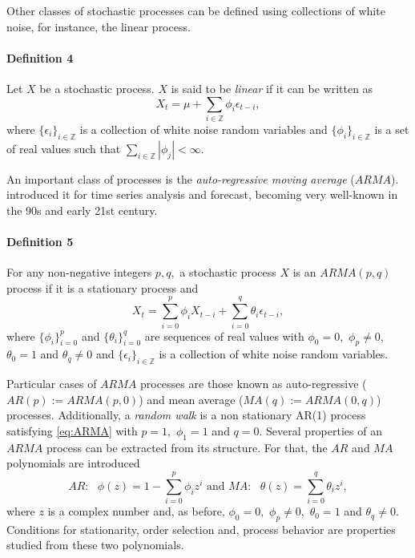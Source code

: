 Other classes of stochastic processes can be defined using collections of white noise, for instance, the linear process.

\paragraph{Definition 4}\label{definition-4}

Let \(X\) be a stochastic process. \(X\) is said to be \emph{linear} if it can be written as
\[
X_t = \mu + \sum_{i\in\mathbb{Z}}\phi_i\epsilon_{t-i},
\]
where \(\{\epsilon_i\}_{i\in\mathbb{Z}}\) is a collection of white noise random variables and \(\{\phi_i\}_{i\in\mathbb{Z}}\) is a set of real values such that \(\sum_{i\in\mathbb{Z}} |\phi_j| < \infty.\)

An important class of processes is the \emph{auto-regressive moving average} (\(ARMA\)). \citet{Box1990} introduced it for time series analysis and forecast, becoming very well-known in the 90s and early 21st century.

\paragraph{Definition 5}\label{definition-5}

For any non-negative integers \(p,q,\) a stochastic process \(X\) is an \(ARMA(p,q)\) process if it is a stationary process and
\begin{equation}
  X_t = \sum_{i=0}^p \phi_iX_{t-i}  +\sum_{i=0}^q \theta_i\epsilon_{t-i}, \label{eq:ARMA}
\end{equation}
where \(\{\phi_i\}_{i=0}^p\) and \(\{\theta_i\}_{i=0}^q\) are sequences of real values with \(\phi_0= 0,\) \(\phi_p\neq 0,\) \(\theta_0=1\) and \(\theta_q\neq 0\) and \(\{\epsilon_{i}\}_{i\in\mathbb{Z}}\) is a collection of white noise random variables.

Particular cases of \(ARMA\) processes are those known as auto-regressive (\(AR(p) := ARMA(p,0)\)) and mean average (\(MA(q) := ARMA(0,q)\)) processes. Additionally, a \emph{random walk} is a non stationary AR(1)
process satisfying \eqref{eq:ARMA} with \(p=1,\) \(\phi_1 = 1\) and \(q=0.\) Several properties of an \(ARMA\) process can be extracted from its structure. For that, the \(AR\) and \(MA\) polynomials are introduced
\[
 AR:\text{ } \phi(z) = 1-\sum_{i=0}^p \phi_i z^i \text{ and } MA:\text{ } \theta(z) = \sum_{i=0}^q \theta_i z^i,
\]
where \(z\) is a complex number and, as before, \(\phi_0 = 0,\) \(\phi_p\neq 0,\) \(\theta_0= 1\) and \(\theta_q\neq 0.\) Conditions for stationarity, order selection and, process behavior are properties studied from these two polynomials.

